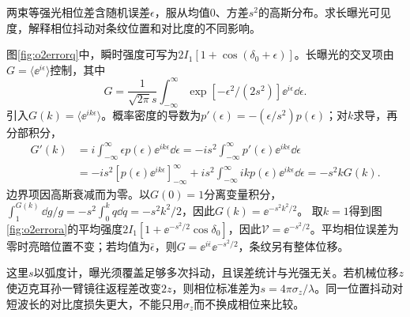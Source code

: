 \begin{exercise}\label{ex:o2phaseerror}
两束等强光相位差含随机误差$\epsilon$，服从均值0、方差$s^2$的高斯分布。求长曝光可见度，解释相位抖动对条纹位置和对比度的不同影响。
\end{exercise}
\begin{solution}
图\ref{fig:o2errorq}中，瞬时强度可写为$2I_1[1+\cos(\delta_0+\epsilon)]$。长曝光的交叉项由$G=\langle\ee^{i\epsilon}\rangle$控制，其中
\[
 G=\frac1{\sqrt{2\pi}s}\int_{-\infty}^\infty
 \exp[-\epsilon^2/(2s^2)]\ee^{i\epsilon}\dd\epsilon.
\]
引入$G(k)=\langle\ee^{ik\epsilon}\rangle$。概率密度的导数为$p'(\epsilon)=-(\epsilon/s^2)p(\epsilon)$；对$k$求导，再分部积分，
\begin{align*}
 G'(k)&=i\int_{-\infty}^{\infty}\epsilon p(\epsilon)\ee^{ik\epsilon}\dd\epsilon
 =-is^2\int_{-\infty}^{\infty}p'(\epsilon)\ee^{ik\epsilon}\dd\epsilon\\
 &=-is^2[p(\epsilon)\ee^{ik\epsilon}]_{-\infty}^{\infty}
 +is^2\int_{-\infty}^{\infty}ikp(\epsilon)\ee^{ik\epsilon}\dd\epsilon
 =-s^2kG(k).
\end{align*}
边界项因高斯衰减而为零。以$G(0)=1$分离变量积分，$\int_1^{G(k)}\dd g/g=-s^2\int_0^kq\dd q=-s^2k^2/2$，因此$G(k)=\ee^{-s^2k^2/2}$。
取$k=1$得到图\ref{fig:o2errora}的平均强度$2I_1[1+\ee^{-s^2/2}\cos\delta_0]$，因此$\mathcal V=\ee^{-s^2/2}$。平均相位误差为零时亮暗位置不变；若均值为$\bar\epsilon$，则$G=\ee^{i\bar\epsilon}\ee^{-s^2/2}$，条纹另有整体位移。

这里$s$以弧度计，曝光须覆盖足够多次抖动，且误差统计与光强无关。若机械位移$z$使迈克耳孙一臂镜往返程差改变$2z$，则相位标准差为$s=4\pi\sigma_z/\lambda$。同一位置抖动对短波长的对比度损失更大，不能只用$\sigma_z$而不换成相位来比较。
\end{solution}

